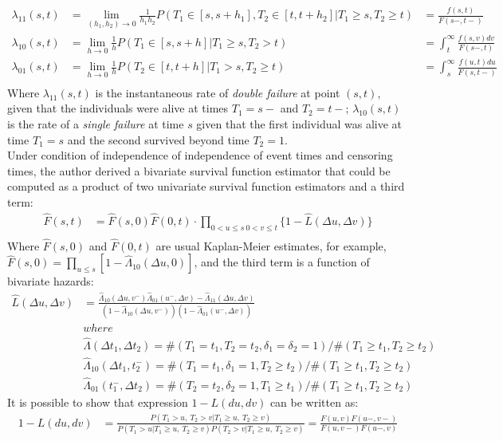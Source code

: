 \documentclass[]{article}
\begin{document}
	$$
	\begin{aligned}
		\lambda_{11}(s,t) &= \lim_{(h_1,h_2)\rightarrow 0} \frac{1}{h_1 h_2} P(T_1\in[s,s+h_1], T_2\in[t,t+h_2] | T_1\geq s, T_2 \geq t) & = \frac{f(s,t)}{F(s-, t-)}\\
		\lambda_{10}(s,t) &= \lim_{h\rightarrow 0} \frac{1}{h} P(T_1\in[s,s+h] | T_1\geq s, T_2 > t) & = \int_t^{\infty} \frac{f(s,v)dv}{F(s-, t)}\\
		\lambda_{01}(s,t) &= \lim_{h\rightarrow 0} \frac{1}{h} P(T_2\in[t,t+h] | T_1 > s, T_2 \geq t) & = \int_s^{\infty} \frac{f(u,t)du}{F(s, t-)}\\
	\end{aligned}
	$$
Where $\lambda_{11}(s,t)$ is the instantaneous rate of \emph{double failure} at point $(s,t)$, given that the individuals were alive at times $T_1=s-$ and $T_2 = t-$; $\lambda_{10}(s, t)$ is the rate of a \emph{single failure} at time $s$ given that the first individual was alive at time $T_1=s$ and the second survived beyond time $T_2 = 1$.\\

Under condition of independence of independence of event times and censoring times, the author derived a bivariate survival function estimator that could be computed as a product of two univariate survival function estimators and a third term:
	$$
	\begin{aligned}
		\hat{F}(s,t) &= \hat{F}(s,0)\hat{F}(0,t)\cdot \prod_{{0<u\leq s~0<v\leq t}}\{1 - \hat{L}(\Delta u, \Delta v)\}\\
	\end{aligned}
	$$
Where $\hat{F}(s,0)$ and $\hat{F}(0,t)$ are usual Kaplan-Meier estimates, for example, $\hat{F}(s,0) = \prod_{u\leq s}[1-\hat{\Lambda}_{10}(\Delta u, 0)]$, and the third term is a function of bivariate hazards:
	$$
	\begin{aligned}
    \hat{L}(\Delta u, \Delta v) &= \frac{\hat{\Lambda}_{10}(\Delta u,v^-)\hat{\Lambda}_{01}(u^-,\Delta v) - \hat{\Lambda}_{11}(\Delta u,\Delta v)}{\left(1-\hat{\Lambda}_{10}(\Delta u,v^-)\right)\left(1-\hat{\Lambda}_{01}(u^-,\Delta v)\right)}\\
  &where\\
	&\hat{\Lambda}(\Delta t_1, \Delta t_2) = \#(T_1=t_1, T_2=t_2, \delta_1=\delta_2=1)/\#(T_1\geq t_1, T_2\geq t_2)\\
	&\hat{\Lambda}_{10}(\Delta t_1, t_2^-) = \#(T_1=t_1, \delta_1=1, T_2\geq t_2)/\#(T_1\geq t_1, T_2\geq t_2)\\
	&\hat{\Lambda}_{01}(t_1^-,\Delta  t_2) = \#(T_2=t_2, \delta_2=1, T_1\geq t_1)/\#(T_1\geq t_1, T_2\geq t_2)		
	\end{aligned}
	$$
It is possible to show that expression $1-L(du, dv)$ can be written as:
	$$
	\begin{aligned}
		1 - L(du, dv) &= \frac{P(T_1>u,~T_2>v|T_1\geq u,~T_2\geq v)}  {P(T_1>u|T_1\geq u,~T_2\geq v)P(T_2>v|T_1\geq u,~T_2\geq v)} =
		\frac{ F(u,v)F(u-,v-) }{ F(u,v-)F(u-,v) }
	\end{aligned}
	$$
\end{document}
